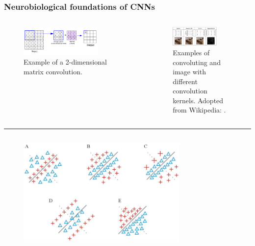 \documentclass[a4paper,9pt]{beamer}
\theoremstyle{mytheoremstyle}
\begin{document}
\begin{frame}
\frametitle{Neurobiological foundations of CNNs}
\begin{columns}
\begin{figure}
\begin{center}
  \includegraphics[width=0.75\textwidth]{res/convolution.png}
\end{center}
	\caption{Example of a 2-dimensional matrix convolution.}
\end{figure}
\begin{figure}
\begin{center}
  \includegraphics[width=0.75\textwidth]{res/convolution_kernels_examples.png}
\end{center}
	\caption{Examples of convoluting and image with different convolution kernels. Adopted from Wikipedia: \parencite{wiki:kernel}.}
\end{figure}
\end{columns}
\hrule
\begin{columns}
\begin{figure}
\begin{center}
  \includegraphics[width=0.75\textwidth]{res/simple_cells.png}

\end{center}
\end{figure}
\end{columns}
\end{frame}
\end{document}

